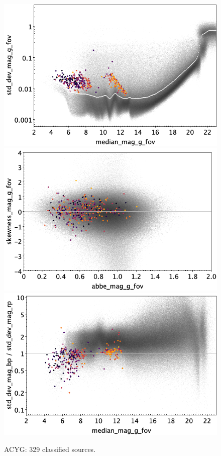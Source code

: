 \documentclass[longauth]{aa}
\begin{document}
\begin{appendix}
\begin{figure}
\hspace{2mm}
 \includegraphics[width=0.45\hsize]{figures/appendix/ACYG_cls_msd.png} \\ %
\vspace{4mm}
 \includegraphics[width=0.45\hsize]{figures/appendix/ACYG_cls_ask.png}  %
\hspace{2mm}
 \includegraphics[width=0.45\hsize]{figures/appendix/ACYG_cls_msdr.png}  \\ %
\vspace{4mm}
 \caption{ACYG: 329 classified sources.}  
 \label{fig:app:ACYG}
\end{figure}


\end{appendix}
\end{document}
